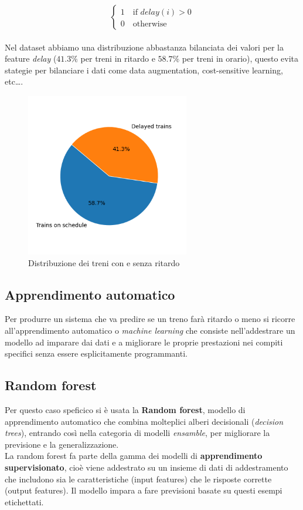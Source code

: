 \documentclass[italian,12pt,a4paper]{article}
\begin{document}
			\begin{equation*}
				\begin{cases}
					1 \quad \text{if } delay(i) > 0  \\
					0 \quad \text{otherwise}
				\end{cases}
			\end{equation*}
			\linebreak
			\\
			Nel dataset abbiamo una distribuzione abbastanza bilanciata dei valori per la feature \textit{delay} ($41.3\%$ per treni in ritardo e $58.7\%$ per treni in orario), questo evita stategie per bilanciare i dati come data augmentation, cost-sensitive learning, etc\dots.
			
			\begin{figure}[!h]
				\centering
				\includegraphics[width=270px]{img/delay_graph}
				\caption{Distribuzione dei treni con e senza ritardo}
			\end{figure}
			
	\subsection{Apprendimento automatico}
	Per produrre un sistema che va predire se un treno farà ritardo o meno si ricorre all'apprendimento automatico o \textit{machine learning} che consiste nell'addestrare un modello ad imparare dai dati e a migliorare le proprie prestazioni nei compiti specifici senza essere esplicitamente programmanti.
	
	\subsection{Random forest}
	Per questo caso speficico si è usata la \textbf{Random forest}, modello di apprendimento automatico che combina molteplici alberi decisionali (\textit{decision trees}), entrando così nella categoria di modelli \textit{ensamble}, per migliorare la previsione e la generalizzazione.\\
	La random forest fa parte della gamma dei modelli di \textbf{apprendimento supervisionato}, cioè viene addestrato su un insieme di dati di addestramento che includono sia le caratteristiche (input features) che le risposte corrette (output features). 
	Il modello impara a fare previsioni basate su questi esempi etichettati.
		
\end{document}
